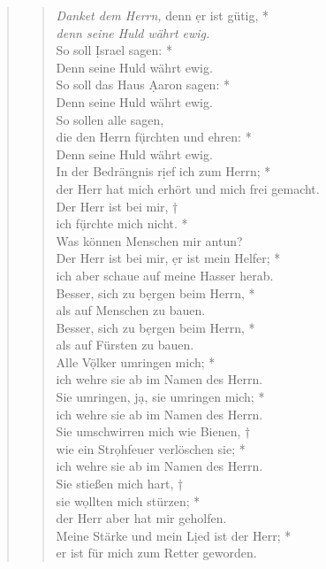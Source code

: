 \begin{quote}
\begin{verse}
\textit{Danket dem Herrn,} denn \d er ist gütig, *\\
\textit{denn seine Huld währt ewig.}\\
\vin So soll \d Israel sagen: *\\
\vin Denn seine Huld währt ewig.\\
So soll das Haus \d Aaron sagen: *\\
Denn seine Huld währt ewig.\\
\vin So sollen alle sagen,\\
\vin die den Herrn f\d ürchten und ehren: *\\
\vin Denn seine Huld währt ewig.\\
In der Bedrängnis r\d ief ich zum Herrn; *\\ 
der Herr hat mich erhört und mich frei gemacht.\\
\vin Der Herr ist bei mir, †\\
\vin ich f\d ürchte mich nicht. *\\
\vin Was können Menschen mir antun?\\
Der Herr ist bei mir, \d er ist mein Helfer; *\\
ich aber schaue auf meine Hasser herab.\\
\vin Besser, sich zu b\d ergen beim Herrn, *\\
\vin als auf Menschen zu bauen.\\
Besser, sich zu b\d ergen beim Herrn, *\\
als auf Fürsten zu bauen.\\
\vin Alle V\d ölker umringen mich; *\\
\vin ich wehre sie ab im Namen des Herrn.\\
Sie umringen, j\d a, sie umringen mich; *\\
ich wehre sie ab im Namen des Herrn.\\
\vin Sie umschwirren mich wie Bienen, †\\
\vin wie ein Str\d ohfeuer verlöschen sie; *\\
\vin ich wehre sie ab im Namen des Herrn.\\
Sie stießen mich hart, †\\
sie w\d ollten mich stürzen; *\\
der Herr aber hat mir geholfen.\\
\vin Meine Stärke und mein L\d ied ist der Herr; *\\
\vin er ist für mich zum Retter geworden.\\

\end{verse}
\end{quote}

